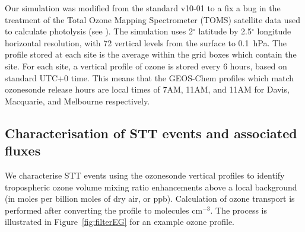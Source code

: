 \documentclass{article}
\begin{document}
    Our simulation was modified from the standard v10-01 to a fix a bug in the treatment of the Total Ozone Mapping Spectrometer (TOMS) satellite data used to calculate photolysis (see \citet{TomsFix2016}).
    The simulation uses 2$^{\circ}$ latitude by 2.5$^{\circ}$ longitude horizontal resolution, with 72 vertical levels from the surface to 0.1~hPa.
    The profile stored at each site is the average within the grid boxes which contain the site.
    For each site, a vertical profile of ozone is stored every 6 hours, based on standard UTC+0 time.
    This means that the GEOS-Chem profiles which match ozonesonde release hours are local times of 7AM, 11AM, and 11AM for Davis, Macquarie, and Melbourne respectively.
    
    
  \subsection{Characterisation of STT events and associated fluxes}
    \label{Section:CharacterisationOfSTTs}
    
    We characterise STT events using the ozonesonde vertical profiles to identify tropospheric ozone volume mixing ratio enhancements above a local background (in moles per billion moles of dry air, or ppb).
    Calculation of ozone transport is performed after converting the profile to molecules cm$^{-3}$.
    The process is illustrated in Figure~\ref{fig:filterEG} for an example ozone profile.
    
\end{document}
